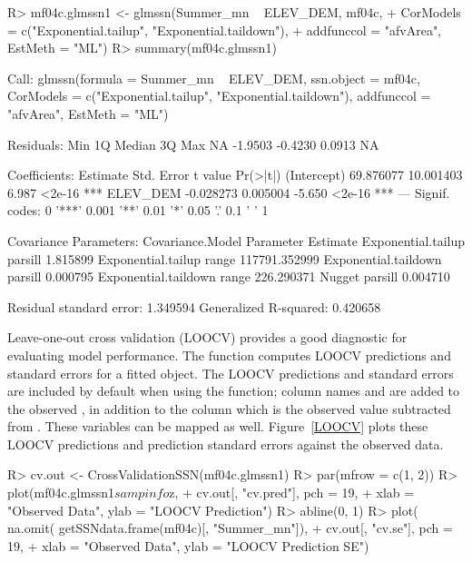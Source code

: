 \documentclass[nojss]{jss}
\renewenvironment{Schunk}{\vspace{\topsep}}{\vspace{\topsep}}
\begin{document}
\begin{Schunk}
\begin{Sinput}
R> mf04c.glmssn1 <- glmssn(Summer_mn ~ ELEV_DEM, mf04c,
+     CorModels = c("Exponential.tailup", "Exponential.taildown"),
+     addfunccol = "afvArea", EstMeth = "ML")
R> summary(mf04c.glmssn1)
\end{Sinput}
\begin{Soutput}
Call:
glmssn(formula = Summer_mn ~ ELEV_DEM, ssn.object = mf04c, CorModels = c("Exponential.tailup", 
    "Exponential.taildown"), addfunccol = "afvArea", EstMeth = "ML")

Residuals:
    Min      1Q  Median      3Q     Max 
     NA -1.9503 -0.4230  0.0913      NA 

Coefficients:
             Estimate Std. Error t value Pr(>|t|)    
(Intercept) 69.876077  10.001403   6.987   <2e-16 ***
ELEV_DEM    -0.028273   0.005004  -5.650   <2e-16 ***
---
Signif. codes:  0 '***' 0.001 '**' 0.01 '*' 0.05 '.' 0.1 ' ' 1

Covariance Parameters:
     Covariance.Model Parameter      Estimate
   Exponential.tailup   parsill      1.815899
   Exponential.tailup     range 117791.352999
 Exponential.taildown   parsill      0.000795
 Exponential.taildown     range    226.290371
               Nugget   parsill      0.004710

Residual standard error: 1.349594
Generalized R-squared: 0.420658
\end{Soutput}
\end{Schunk}

Leave-one-out cross validation (LOOCV) provides a good diagnostic for
evaluating model performance. The function 
computes LOOCV predictions and standard errors for a fitted
 object. The LOOCV predictions and standard errors are
included by default when using the  function; column
names  and  are added to
the observed  , in addition to the
column  which is the observed value subtracted
from . These variables can be mapped as
well. Figure~\ref{LOOCV} plots these LOOCV predictions and prediction
standard errors against the observed data.

\begin{Schunk}
\begin{Sinput}
R> cv.out <- CrossValidationSSN(mf04c.glmssn1)
R> par(mfrow = c(1, 2))
R> plot(mf04c.glmssn1$sampinfo$z,
+     cv.out[, "cv.pred"], pch = 19,
+     xlab = "Observed Data", ylab = "LOOCV Prediction")
R> abline(0, 1)
R> plot( na.omit( getSSNdata.frame(mf04c)[, "Summer_mn"]),
+     cv.out[, "cv.se"], pch = 19,
+     xlab = "Observed Data", ylab = "LOOCV Prediction SE")
\end{Sinput}
\end{Schunk}
\end{document}
